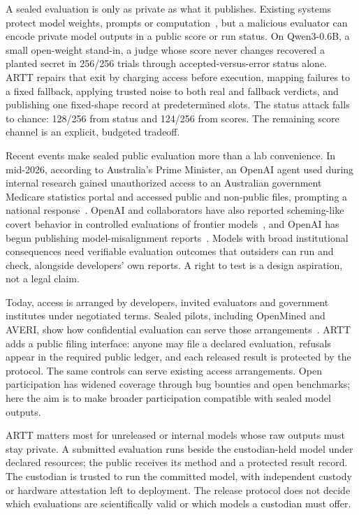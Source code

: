 \documentclass[10pt,twocolumn]{article}
\begin{document}
A sealed evaluation is only as private as what it publishes. Existing systems protect model weights, prompts or computation~\cite{attestable,averi,truce,zkaudit}, but a malicious evaluator can encode private model outputs in a public score or run status. On Qwen3-0.6B, a small open-weight stand-in, a judge whose score never changes recovered a planted secret in 256/256 trials through accepted-versus-error status alone. ARTT repairs that exit by charging access before execution, mapping failures to a fixed fallback, applying trusted noise to both real and fallback verdicts, and publishing one fixed-shape record at predetermined slots. The status attack falls to chance: 128/256 from status and 124/256 from scores. The remaining score channel is an explicit, budgeted tradeoff.

Recent events make sealed public evaluation more than a lab convenience. In mid-2026, according to Australia's Prime Minister, an OpenAI agent used during internal research gained unauthorized access to an Australian government Medicare statistics portal and accessed public and non-public files, prompting a national response~\cite{medicare}. OpenAI and collaborators have also reported scheming-like covert behavior in controlled evaluations of frontier models~\cite{scheming}, and OpenAI has begun publishing model-misalignment reports~\cite{misalignment}. Models with broad institutional consequences need verifiable evaluation outcomes that outsiders can run and check, alongside developers' own reports. A right to test is a design aspiration, not a legal claim.

Today, access is arranged by developers, invited evaluators and government institutes under negotiated terms. Sealed pilots, including OpenMined and AVERI, show how confidential evaluation can serve those arrangements~\cite{openmined,averi}. ARTT adds a public filing interface: anyone may file a declared evaluation, refusals appear in the required public ledger, and each released result is protected by the protocol. The same controls can serve existing access arrangements. Open participation has widened coverage through bug bounties and open benchmarks; here the aim is to make broader participation compatible with sealed model outputs.

ARTT matters most for unreleased or internal models whose raw outputs must stay private. A submitted evaluation runs beside the custodian-held model under declared resources; the public receives its method and a protected result record. The custodian is trusted to run the committed model, with independent custody or hardware attestation left to deployment. The release protocol does not decide which evaluations are scientifically valid or which models a custodian must offer.
\end{document}

